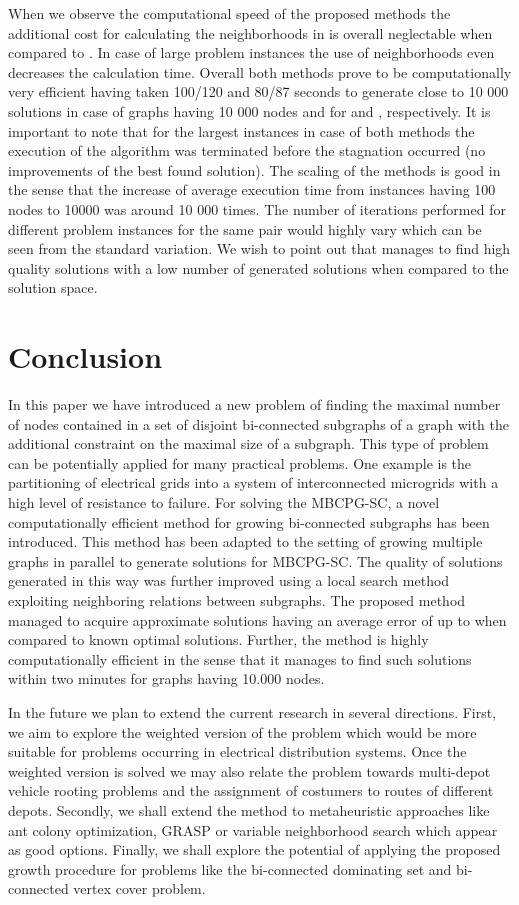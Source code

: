 When we observe the computational speed of the proposed methods the additional cost for calculating the neighborhoods in  is overall neglectable  when compared to . In case of large problem instances the use of neighborhoods even decreases the calculation time. Overall both methods prove to be computationally  very efficient having taken  100/120 and 80/87 seconds to generate close to 10 000 solutions in case of graphs having 10 000 nodes and  for  and , respectively. It is important to note that for the largest instances in case of both methods the execution of the algorithm was terminated before the stagnation occurred (no improvements of the best found solution). The scaling of the methods is good in the sense that the increase of average execution time from instances having 100 nodes to 10000 was around 10 000 times. The number of iterations performed for different problem instances for the same pair  would highly vary which can be seen from the standard variation. We wish to point out that   manages to find high quality solutions with a  low number of generated solutions when compared to the solution space. 

\section{Conclusion}

In this paper we have introduced a new problem of finding the maximal number of nodes contained in a set of disjoint bi-connected subgraphs of a graph with the additional constraint on the maximal  size of a subgraph. This type of problem can be potentially applied for many practical problems. One example is the partitioning of electrical grids into a system of interconnected microgrids with a high level of resistance to failure. For solving the MBCPG-SC, a novel computationally efficient method for growing bi-connected subgraphs has been introduced. This method has been adapted to the setting of growing multiple graphs in parallel to generate solutions for MBCPG-SC. The quality of solutions generated in this way  was further improved using a local search method exploiting neighboring relations between subgraphs. The proposed method managed to  acquire  approximate solutions having an average error of up to  when compared to known optimal solutions.  Further, the method is highly computationally efficient in the sense that it manages to find such solutions within two minutes for graphs having 10.000 nodes.

In the future we plan to extend the current research in several directions. First, we aim to  explore the weighted version of the problem which would be more suitable for problems occurring in electrical distribution systems. Once the weighted version is solved we may also relate the problem towards  multi-depot vehicle rooting problems and the assignment of costumers to routes of different depots. Secondly, we shall extend the method to metaheuristic approaches like ant colony optimization, GRASP or variable neighborhood search which appear  as good options. Finally, we shall explore the potential of applying the proposed growth procedure for problems like the  bi-connected dominating set and bi-connected  vertex cover problem. 




